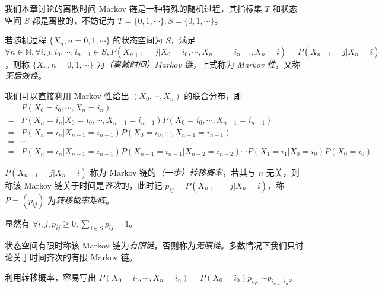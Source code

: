 \documentclass[../main.tex]{subfiles}
\begin{document}
我们本章讨论的离散时间 Markov 链是一种特殊的随机过程，其指标集 $T$ 和状态空间 $S$ 都是离散的，不妨记为 $T=\{0,1,\cdots\},S=\{0,1,\cdots\}$。

\begin{definition}\label{def:7.1.1}
    若随机过程 $\{X_n,n=0,1,\cdots\}$ 的状态空间为 $S$，满足 $\forall n\in\mathbb N,\forall i,j,i_0,\cdots,i_{n-1}\in S,P(X_{n+1}=j|X_0=i_0,\cdots,X_{n-1}=i_{n-1},X_n=i)=P(X_{n+1}=j|X_n=i)$，则称 $\{X_n,n=0,1,\cdots\}$ 为\emph{（离散时间）Markov 链}，上式称为 \emph{Markov 性}，又称\emph{无后效性}。
\end{definition}

我们可以直接利用 Markov 性给出 $(X_0,\cdots,X_n)$ 的联合分布，即
\begin{equation*}
    \begin{aligned}
          & P(X_0=i_0,\cdots,X_n=i_n)                                                                       \\
        = & P(X_n=i_n|X_0=i_0,\cdots,X_{n-1}=i_{n-1})P(X_0=i_0,\cdots,X_{n-1}=i_{n-1})                      \\
        = & P(X_n=i_n|X_{n-1}=i_{n-1})P(X_0=i_0,\cdots,X_{n-1}=i_{n-1})                                     \\
        = & \cdots                                                                                          \\
        = & P(X_n=i_n|X_{n-1}=i_{n-1})P(X_{n-1}=i_{n-1}|X_{n-2}=i_{n-2})\cdots P(X_1=i_1|X_0=i_0)P(X_0=i_0)
    \end{aligned}
\end{equation*}

\begin{definition}\label{def:7.1.2}
    $P(X_{n+1}=j|X_n=i)$ 称为 Markov 链的\emph{（一步）转移概率}，若其与 $n$ 无关，则称该 Markov 链关于时间是\emph{齐次}的，此时记 $p_{ij}=P(X_{n+1}=j|X_n=i)$，称 $P=(p_{ij})$ 为\emph{转移概率矩阵}。
\end{definition}

显然有 $\forall i,j,p_{ij}\geq0,\sum_{j\in S}p_{ij}=1$。

状态空间有限时称该 Markov 链为\emph{有限链}，否则称为\emph{无限链}。多数情况下我们只讨论关于时间齐次的有限 Markov 链。

利用转移概率，容易写出 $P(X_0=i_0,\cdots,X_n=i_n)=P(X_0=i_0)p_{i_0i_1}\cdots p_{i_{n-1}i_n}$。
\end{document}
